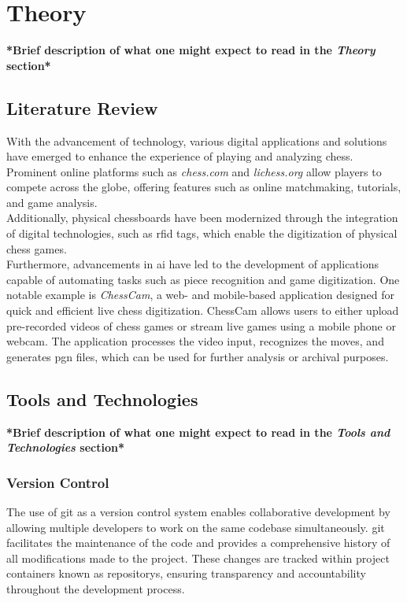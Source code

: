 \chapter{Theory}

\textbf{*Brief description of what one might expect to read in the \textit{Theory} section*}

\section{Literature Review}

With the advancement of technology, various digital applications and solutions have emerged to enhance the experience of playing and analyzing chess. Prominent online platforms such as \textit{chess.com} and \textit{lichess.org} allow players to compete across the globe, offering features such as online matchmaking, tutorials, and game analysis. \\
Additionally, physical chessboards have been modernized through the integration of digital technologies, such as \gls{rfid} tags, which enable the digitization of physical chess games. \cite{quora:shah} \\

Furthermore, advancements in \gls{ai} have led to the development of applications capable of automating tasks such as piece recognition and game digitization. One notable example is \textit{ChessCam}, a web- and mobile-based application designed for quick and efficient live chess digitization. ChessCam allows users to either upload pre-recorded videos of chess games or stream live games using a mobile phone or webcam. The application processes the video input, recognizes the moves, and generates \gls{pgn} files, which can be used for further analysis or archival purposes.

\section{Tools and Technologies}

\textbf{*Brief description of what one might expect to read in the \textit{Tools and Technologies} section*}

\subsection{Version Control}

The use of \gls{git} as a version control system enables collaborative development by allowing multiple developers to work on the same codebase simultaneously. \gls{git} facilitates the maintenance of the code and provides a comprehensive history of all modifications made to the project. These changes are tracked within project containers known as \glspl{repository}, ensuring transparency and accountability throughout the development process. \cite{alphaefficiency:git}

